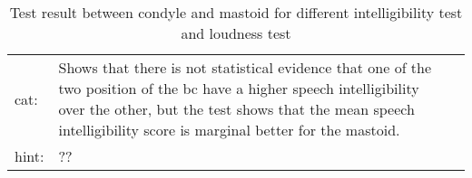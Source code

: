  
\begin{table}[H]
\begin{tabularx}{\textwidth}{l X l}
\hline
\gls{cat}: & Shows that there is not statistical evidence that one of the two position of the \gls{bc} have a higher speech intelligibility over the other, but the test shows that the mean speech intelligibility score is marginal better for the mastoid. \\
\gls{hint}: & ?? \\ \hline
\end{tabularx}
\caption{Test result between condyle and mastoid for different intelligibility test and loudness test} 
\label{tab:test_methoed}
\end{table}



